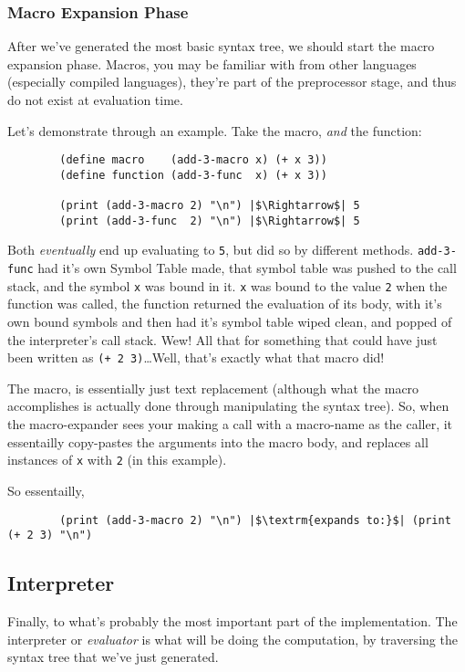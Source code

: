 \documentclass{article}
\newcommand{\code}[1]{\texttt{#1}}
\begin{document}
      \clearpage

      \subsubsection{Macro Expansion Phase}
      After we've generated the most basic syntax tree, we should start the macro
      expansion phase.  Macros, you may be familiar with from other languages
      (especially compiled languages), they're part of the preprocessor stage,
      and thus do not exist at evaluation time.

      Let's demonstrate through an example. Take the macro, \emph{and} the function:

      \begin{verbatim}
        (define macro    (add-3-macro x) (+ x 3))
        (define function (add-3-func  x) (+ x 3))

        (print (add-3-macro 2) "\n") |$\Rightarrow$| 5
        (print (add-3-func  2) "\n") |$\Rightarrow$| 5
      \end{verbatim}

      Both \emph{eventually} end up evaluating to \code{5}, but did so by different
      methods. \code{add-3-func} had it's own Symbol Table made, that symbol table
      was pushed to the call stack, and the symbol \code{x} was bound in it.
      \code{x} was bound to the value \code{2} when the function was called, the
      function returned the evaluation of its body, with it's own bound symbols
      and then had it's symbol table wiped clean, and popped of the interpreter's
      call stack. Wew! All that for something that could have just been written
      as \code{(+ 2 3)}\ldots Well, that's exactly what that macro did!

      The macro, is essentially just text replacement (although what the macro
      accomplishes is actually done through manipulating the syntax tree).
      So, when the macro-expander sees your making a call with a macro-name as the
      caller, it essentailly copy-pastes the arguments into the macro body, and
      replaces all instances of \code{x} with \code{2} (in this example).

      So essentailly,
      \begin{verbatim}
        (print (add-3-macro 2) "\n") |$\textrm{expands to:}$| (print (+ 2 3) "\n")
      \end{verbatim}

  \subsection{Interpreter}
    Finally, to what's probably the most important part of the implementation.
    The interpreter or \emph{evaluator} is what will be doing the computation,
    by traversing the syntax tree that we've just generated.
\end{document}
